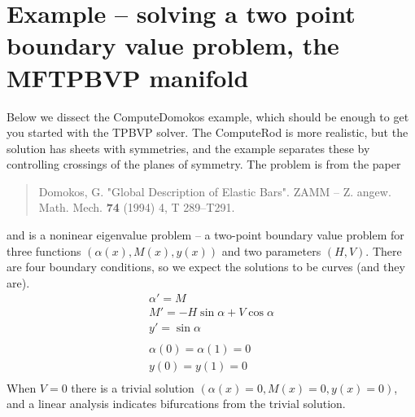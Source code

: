 \documentclass[12pt]{article}
\begin{document}
\section{Example -- solving a two point boundary value problem, the MFTPBVP manifold}

Below we dissect the ComputeDomokos example, which should be enough to get you started with the 
TPBVP solver. The ComputeRod is more realistic, but the solution has sheets with symmetries, and
the example separates these by controlling crossings of the planes of symmetry. The problem is
from the paper
\begin{quote}
Domokos, G. "Global Description of Elastic Bars". ZAMM -- Z. angew. Math. Mech. {\bf 74} (1994) 4, T 289--T291.
\end{quote}
and is a noninear eigenvalue problem -- a two-point boundary value problem for three functions $(\alpha(x),M(x),y(x))$ and 
two parameters $(H,V)$. There are four boundary conditions, so we expect the solutions to be curves (and they are).
\begin{displaymath}
\begin{array}{l}
\displaystyle \alpha' = M\\
\displaystyle M' = -H\sin\alpha + V\cos\alpha\\
\displaystyle y' = \sin\alpha\\
\\
\displaystyle \alpha(0)=\alpha(1)=0\\
\displaystyle y(0)=y(1)=0\\
\end{array}
\end{displaymath}
When $V=0$ there is a trivial solution $(\alpha(x)=0,M(x)=0,y(x)=0)$, and a linear analysis indicates bifurcations from the
trivial solution.
\end{document}
